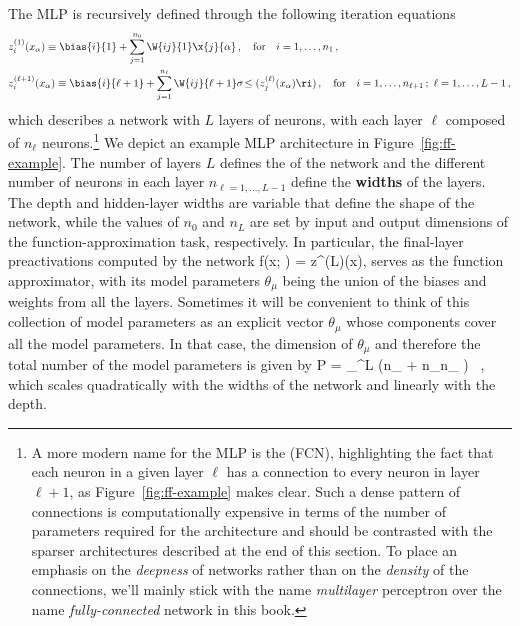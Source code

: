 The MLP is recursively defined through the following iteration equations
\begin{align}\label{eq:mlp-definition}
&z_i^{(1)}(x_\alpha)\equiv\bias{i}{1}+\sum_{j=1}^{n_{0}}\W{ij}{1}\x{j}{\alpha}\,, \quad \text{for} \quad i=1,\ldots,n_1\, ,\, \\
&z_i^{(\ell+1)}(x_\alpha)\equiv\bias{i}{\ell+1}+\sum_{j=1}^{n_{\ell}}\W{ij}{\ell+1}\sigma\!\le(z_j^{(\ell)}(x_\alpha)\ri)\, , \quad \text{for} \quad i=1,\ldots,n_{\ell+1}\, ;~ \ell=1,\ldots,L-1\, , \notag
\end{align}
which describes a network with $L$ layers of neurons, with each layer $\ell$ composed of $n_\ell$ neurons.\footnote{
 A more modern name for the MLP is the  (FCN),
highlighting the fact that each neuron in a given layer $\ell$ has a connection to every neuron in layer $\ell+1$, as Figure~\ref{fig:ff-example} makes clear. Such a dense pattern of connections is computationally expensive in terms of the number of parameters required for the architecture and should be contrasted with the sparser architectures described at the end of this section.
To place an emphasis on the \emph{deepness} of networks rather than on the \emph{density} of the connections, we'll mainly stick with the name \emph{multilayer} perceptron over the name \emph{fully-connected} network in this book.
}
We depict an example MLP architecture in Figure~\ref{fig:ff-example}. The number of layers $L$ defines the  of the network and the different number of neurons in each layer $n_{\ell=1,\ldots,L-1}$ define the \textbf{widths} of the layers.
The depth and hidden-layer widths are variable  that define the shape of the network, while the values of $n_0$ and $n_{L}$ are set by input and output dimensions of the function-approximation task, respectively.
In particular, the final-layer preactivations computed by the network
\be
f\!\le(x; \theta\ri) = z^{(L)}(x),
\ee
serves as the function approximator, with its model parameters $\theta_{\mu}$ being the union of the biases and weights from all the layers. Sometimes it will be convenient to think of this collection of model parameters as an explicit vector $\theta_\mu$ whose components cover all the model parameters.
In that case, the dimension of $\theta_\mu$ and therefore the total number of the model parameters is given
by
\be
P = \sum_{}^{L} \le(n_{\ell} + n_{\ell}n_{} \ri) \, ,
\ee
which scales quadratically with the widths of the network and linearly with the depth.


